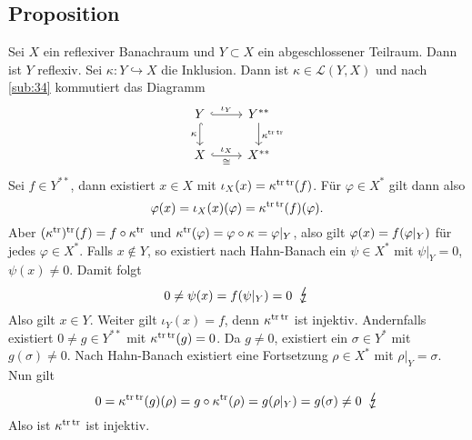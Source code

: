 \subsection[Proposition: Abgeschlossene Unterräume von reflexiven Banachräumen sind reflexiv]{Proposition} %
\label{sub:514}
Sei $X$ ein reflexiver Banachraum und $Y \subset X$ ein abgeschlossener Teilraum. Dann ist $Y$ reflexiv.
Sei $\kappa \colon Y \hookrightarrow X$ die Inklusion. Dann ist $\kappa \in \mathcal{L}(Y,X)$ und nach \ref{sub:34} kommutiert das Diagramm
\[
	\begin{tikzcd}
		Y \rar[hook, "\iota_Y"] \dar["\kappa"', hook]& Y^{**}  \dar["\kappa^{\tr \,\tr}"] \\
		X \rar["\iota_X","\cong"', hook] & X^{**}
	\end{tikzcd}
\]
Sei $f\in Y^{**}$, dann existiert $x \in X$ mit $\iota_X(x)=\kappa^{\mathrm{tr}\,\mathrm{tr}}(f)$. Für $\varphi \in X^*$ gilt dann also
\[
	\varphi(x)=\iota_X(x)(\varphi)=\kappa^{\mathrm{tr}\,\mathrm{tr}}(f)(\varphi).
\]
Aber $(\kappa^{\mathrm{tr}})^{\mathrm{tr}} (f) = f \circ \kappa^{\mathrm{tr}}$ und $\kappa^{\mathrm{tr}}(\varphi) = \varphi \circ \kappa = \varphi|_{Y}$, also gilt $\varphi(x)= f \enbrace*{\varphi|_Y}$ für jedes 
$\varphi \in X^*$. Falls $x \not\in Y$, so existiert nach Hahn-Banach ein $\psi \in X^*$ mit $\psi|_{Y}=0$, $\psi(x)\not= 0$. Damit folgt 
\[
	0 \not= \psi(x) = f \enbrace*{\psi|_{Y}}=0 \enspace\light
\]
Also gilt $x \in Y$. Weiter gilt $\iota_Y(x)=f$, denn $\kappa^{\mathrm{tr}\,\mathrm{tr}}$ ist injektiv. Andernfalls existiert $0 \not= g \in Y^{**}$ mit $\kappa^{\mathrm{tr}\,\mathrm{tr}}(g)=0$. 
Da $g\not= 0$, existiert ein $\sigma \in Y^*$ mit $g(\sigma) \not= 0$. Nach Hahn-Banach existiert eine Fortsetzung $\rho \in X^*$ mit $\rho|_{Y}=\sigma$. Nun gilt 
\[
	0 = \kappa^{\tr\,\tr}(g)(\rho) = g \circ \kappa^\tr(\rho)= g \enbrace*{\rho|_Y} = g(\sigma) \not= 0 \enspace \light 
\]
Also ist $\kappa^{\mathrm{tr}\,\mathrm{tr}}$ ist injektiv. \bewende

